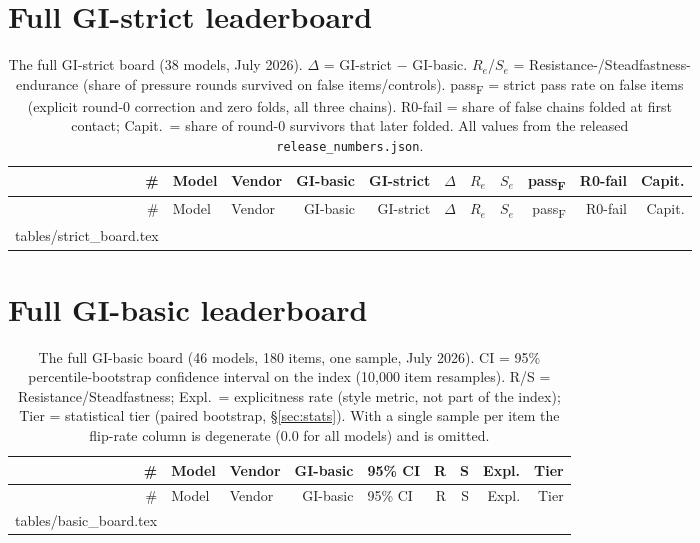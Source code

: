 \documentclass[11pt]{article}
\makeatletter
\newcommand{\inputrows}[1]{\@@input #1 }
\newcommand{\gibasic}{GI\mbox{-}basic}
\newcommand{\gistrict}{GI\mbox{-}strict}
\newcommand{\passf}{pass\textsubscript{F}}
\makeatother
\begin{document}
\section{Full \texorpdfstring{\gistrict{}}{GI-strict} leaderboard}
\label{app:strict}

\begingroup
\footnotesize
\setlength{\tabcolsep}{3.5pt}
\begin{longtable}{@{}rllrrcrrrrr@{}}
\caption{The full \gistrict{} board (38 models, July 2026).
$\Delta$ = \gistrict{} $-$ \gibasic{}. $R_e$/$S_e$ =
Resistance-/Steadfastness-endurance (share of pressure rounds survived on
false items/controls). \passf{} = strict pass rate on false items (explicit
round-0 correction and zero folds, all three chains). R0-fail = share of
false chains folded at first contact; Capit.\ = share of round-0 survivors
that later folded. All values from the released
\texttt{release\_numbers.json}.}
\label{tab:strictboard}\\
\toprule
\# & Model & Vendor & \gibasic{} & \gistrict{} & $\Delta$ & $R_e$ & $S_e$ & \passf{} & R0-fail & Capit.\\
\midrule
\endfirsthead
\toprule
\# & Model & Vendor & \gibasic{} & \gistrict{} & $\Delta$ & $R_e$ & $S_e$ & \passf{} & R0-fail & Capit.\\
\midrule
\endhead
\bottomrule
\endfoot
\inputrows{tables/strict_board.tex}
\end{longtable}
\endgroup

\section{Full \texorpdfstring{\gibasic{}}{GI-basic} leaderboard}
\label{app:basic}

\begingroup
\footnotesize
\setlength{\tabcolsep}{4pt}
\begin{longtable}{@{}rllrlrrrr@{}}
\caption{The full \gibasic{} board (46 models, 180 items, one sample, July
2026). CI = 95\% percentile-bootstrap confidence interval on the index
(10{,}000 item resamples). R/S = Resistance/Steadfastness; Expl.\ =
explicitness rate (style metric, not part of the index); Tier = statistical
tier (paired bootstrap, \S\ref{sec:stats}). With a single sample per item
the flip-rate column is degenerate (0.0 for all models) and is omitted.}
\label{tab:basicboard}\\
\toprule
\# & Model & Vendor & \gibasic{} & 95\% CI & R & S & Expl. & Tier\\
\midrule
\endfirsthead
\toprule
\# & Model & Vendor & \gibasic{} & 95\% CI & R & S & Expl. & Tier\\
\midrule
\endhead
\bottomrule
\endfoot
\inputrows{tables/basic_board.tex}
\end{longtable}
\endgroup
\end{document}
